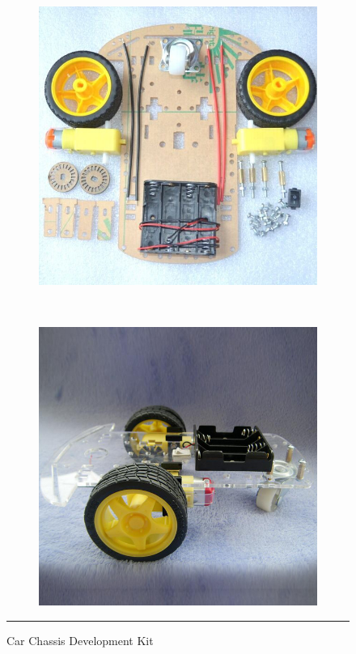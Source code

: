 \begin{figure}[h!]
        \centering
        \begin{subfigure}[b]{0.5\textwidth}
                \includegraphics[width=\textwidth]{./Pictures/Car-Chassis-Kit.jpg}
        \end{subfigure}%
        ~ %
        \begin{subfigure}[b]{0.5\textwidth}
                \includegraphics[width=\textwidth]{./Pictures/Car-Chassis-Kit2.jpg}
        \end{subfigure}
        \rule{1\textwidth}{1pt}
        \caption{Car Chassis Development Kit}
        \label{fig:car_chassis}
\end{figure}
